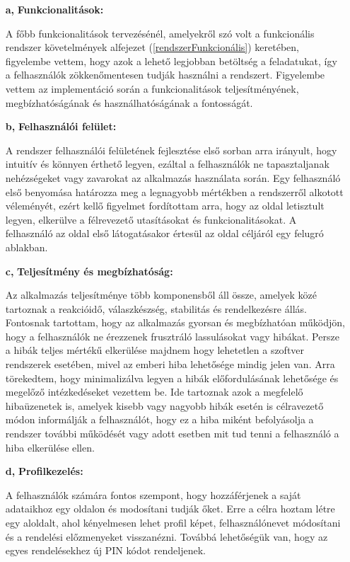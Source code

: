 \begin{itemize}
  	\item[\textbf{a,}] \textbf{Funkcionalitások:}

A főbb funkcionalitások tervezésénél, amelyekről szó volt a funkcionális rendszer követelmények alfejezet (\ref{rendszerFunkcionális}) keretében, figyelembe vettem, hogy azok a lehető legjobban betöltség a feladatukat, így a felhasználók zökkenőmentesen tudják használni a rendszert. Figyelembe vettem az implementáció során a funkcionalitások teljesítményének, megbízhatóságának és használhatóságának a fontosságát.

	\item[\textbf{b,}] \textbf{Felhasználói felület:}

A rendszer felhasználói felületének fejlesztése első sorban arra irányult, hogy intuitív és könnyen érthető legyen, ezáltal a felhasználók ne tapasztaljanak nehézségeket vagy zavarokat az alkalmazás használata során. Egy felhasználó első benyomása határozza meg a legnagyobb mértékben a rendszerről alkotott véleményét, ezért kellő figyelmet fordítottam arra, hogy az oldal letisztult legyen, elkerülve a félrevezető utasításokat és funkcionalitásokat. A felhasználó az oldal első látogatásakor értesül az oldal céljáról egy felugró ablakban.

	\item[\textbf{c,}] \textbf{Teljesítmény és megbízhatóság:}

Az alkalmazás teljesítménye több komponensből áll össze, amelyek közé tartoznak a reakcióidő, válaszkészség, stabilitás és rendelkezésre állás. Fontosnak tartottam, hogy az alkalmazás gyorsan és megbízhatóan működjön, hogy a felhasználók ne érezzenek frusztráló lassulásokat vagy hibákat. Persze a hibák teljes mértékű elkerülése majdnem hogy lehetetlen a szoftver rendszerek esetében, mivel az emberi hiba lehetősége mindig jelen van. Arra törekedtem, hogy minimalizálva legyen a hibák előfordulásának lehetősége és megelőző intézkedéseket vezettem be. Ide tartoznak azok a megfelelő hibaüzenetek is, amelyek kisebb vagy nagyobb hibák esetén is célravezető módon informálják a felhasználót, hogy ez a hiba miként befolyásolja a rendszer további működését vagy adott esetben mit tud tenni a felhasználó a hiba elkerülése ellen.

	\item[\textbf{d,}] \textbf{Profilkezelés:}

A felhasználók számára fontos szempont, hogy hozzáférjenek a saját adataikhoz egy oldalon és modosítani tudják őket. Erre a célra hoztam létre egy aloldalt, ahol kényelmesen lehet profil képet, felhasználónevet módosítani és a rendelési előzmenyeket visszanézni. Továbbá lehetőségük van, hogy az egyes rendelésekhez új PIN kódot rendeljenek.


\end{itemize}
